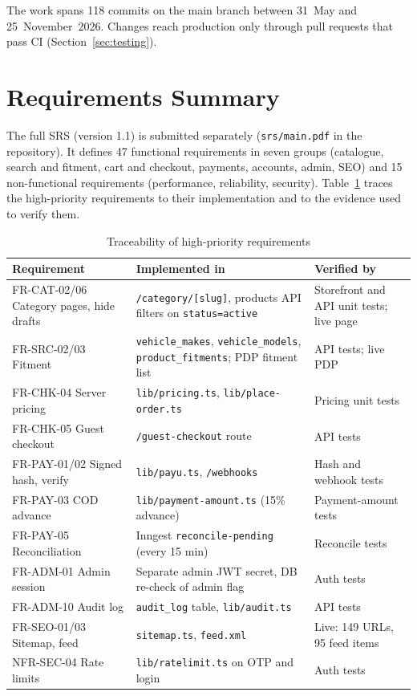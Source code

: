 \documentclass{tietreport}
\begin{document}
The work spans 118 commits on the main branch between 31~May and
25~November~2026. Changes reach production only through pull requests that
pass CI (Section~\ref{sec:testing}).

\section{Requirements Summary}

The full SRS (version 1.1) is submitted separately (\texttt{srs/main.pdf} in
the repository). It defines 47 functional requirements in seven groups
(catalogue, search and fitment, cart and checkout, payments, accounts,
admin, SEO) and 15 non-functional requirements (performance, reliability,
security). Table~\ref{tab:trace} traces the high-priority requirements to
their implementation and to the evidence used to verify them.

\begin{table}[H]
\centering\footnotesize
\begin{tabularx}{\linewidth}{l X X}
\toprule
\textbf{Requirement} & \textbf{Implemented in} & \textbf{Verified by} \\
\midrule
FR-CAT-02/06 Category pages, hide drafts & \texttt{/category/[slug]}, products API filters on \texttt{status=active} & Storefront and API unit tests; live page \\
FR-SRC-02/03 Fitment & \texttt{vehicle\_makes}, \texttt{vehicle\_models}, \texttt{product\_fitments}; PDP fitment list & API tests; live PDP \\
FR-CHK-04 Server pricing & \texttt{lib/pricing.ts}, \texttt{lib/place-order.ts} & Pricing unit tests \\
FR-CHK-05 Guest checkout & \texttt{/guest-checkout} route & API tests \\
FR-PAY-01/02 Signed hash, verify & \texttt{lib/payu.ts}, \texttt{/webhooks} & Hash and webhook tests \\
FR-PAY-03 COD advance & \texttt{lib/payment-amount.ts} (15\% advance) & Payment-amount tests \\
FR-PAY-05 Reconciliation & Inngest \texttt{reconcile-pending} (every 15 min) & Reconcile tests \\
FR-ADM-01 Admin session & Separate admin JWT secret, DB re-check of admin flag & Auth tests \\
FR-ADM-10 Audit log & \texttt{audit\_log} table, \texttt{lib/audit.ts} & API tests \\
FR-SEO-01/03 Sitemap, feed & \texttt{sitemap.ts}, \texttt{feed.xml} & Live: 149 URLs, 95 feed items \\
NFR-SEC-04 Rate limits & \texttt{lib/ratelimit.ts} on OTP and login & Auth tests \\
\bottomrule
\end{tabularx}
\caption{Traceability of high-priority requirements}
\label{tab:trace}
\end{table}
\end{document}
